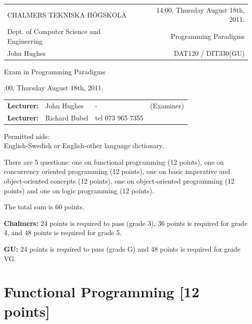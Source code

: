 \documentclass{article}
\begin{document}
\newcommand{\examtime}{14:00, Thursday August 18th, 2011}
\newcommand{\points}[1]{\marginpar{\bf #1 points}}
\noindent
\begin{tabular}{lr}
CHALMERS TEKNISKA H\"OGSKOLA &\examtime{}.\\
Dept. of Computer Science and Engineering & Programming Paradigms\\
John Hughes                  & DAT120 / DIT330(GU) \\
\end{tabular}

\vspace{2.5cm} \noindent
\begin{center} {\LARGE
Exam in Programming Paradigms}
\end{center}

\vspace{1.5cm}

\noindent
\examtime{}.\\
\begin{tabular}{lllc}
\textbf{Lecturer:} &  John Hughes  &  - & (Examiner)\\
\textbf{Lecturer:} & Richard Bubel & tel 073 965 7355 & \\ 
\end{tabular}
\vspace{1cm}

\noindent
Permitted aids:\\
English-Swedish or English-other language dictionary.

There are 5 questions: one on functional
programming (12 points), one on concurrency oriented programming (12
points), one on basic imperative and object-oriented concepts (12
points), one on object-oriented programming (12 points) and one on
logic programming (12 points).

The total sum is 60 points.


\textbf{Chalmers:}
24 points is required to pass (grade 3), 36 points is required for
grade 4, and 48 points is required for grade 5. 

\textbf{GU:}
24 points is required to pass (grade G) and 48 points is required for
grade VG.


\newpage

\section{Functional Programming [12 points]}
\end{document}
